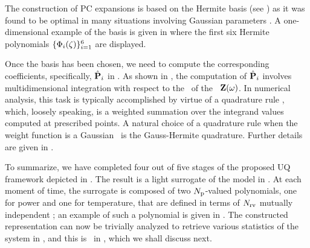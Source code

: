 The construction of PC expansions is based on the Hermite basis (see ) as it was found to be optimal in many situations involving Gaussian parameters \cite{xiu2010}. A one-dimensional example of the basis is given in  where the first six Hermite polynomials $\{ \Phi_i(\zeta) \}_{i = 1}^6$ are displayed.

Once the basis has been chosen, we need to compute the corresponding coefficients, specifically, $\hat{\mathbf{P}}_i$ in . As shown in , the computation of $\hat{\mathbf{P}}_i$ involves multidimensional integration with respect to the \pdf\ of the \rvs\ $\mathbf{Z}(\omega)$. In numerical analysis, this task is typically accomplished by virtue of a quadrature rule \cite{press2007}, which, loosely speaking, is a weighted summation over the integrand values computed at prescribed points. A natural choice of a quadrature rule when the weight function is a Gaussian \pdf\ is the Gauss-Hermite quadrature. Further details are given in .

To summarize, we have completed four out of five stages of the proposed UQ framework depicted in . The result is a light surrogate of the model in . At each moment of time, the surrogate is composed of two ${N_\text{p}}$-valued polynomials, one for power and one for temperature, that are defined in terms of ${N_\text{rv}}$ mutually independent \rvs; an example of such a polynomial is given in . The constructed representation can now be trivially analyzed to retrieve various statistics of the system in , and this is \ in , which we shall discuss next.
